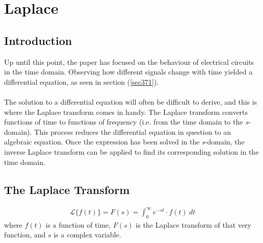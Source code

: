 \chapter{Laplace}
\section{Introduction}
Up until this point, the paper has focused on the behaviour of electrical circuits in the time domain. Observing how different signals change with time yielded a differential equation, as seen in section (\ref{sec371}). \\ \\
The solution to a differential equation will often be difficult to derive, and this is where the Laplace transform comes in handy. The Laplace transform converts functions of time to functions of frequency (i.e. from the time domain to the \textit{s}-domain). This process reduces the differential equation in question to an algebraic equation. Once the expression has been solved in the \textit{s}-domain, the inverse Laplace transform can be applied to find its corresponding solution in the time domain.
\section{The Laplace Transform}
\begin{tcolorbox}[colback=blue!5!white,colframe=blue!75!black,title=Definition]
\begin{align}
\mathcal{L}\{f(t)\}=F(s)=\int_{0}^{\infty} e^{-st}\cdot f(t)\ dt
\label{lpdef}
\end{align}
where $f(t)$ is a function of time, $F(s)$ is the Laplace transform of that very function, and $s$ is a complex variable.
\end{tcolorbox}

